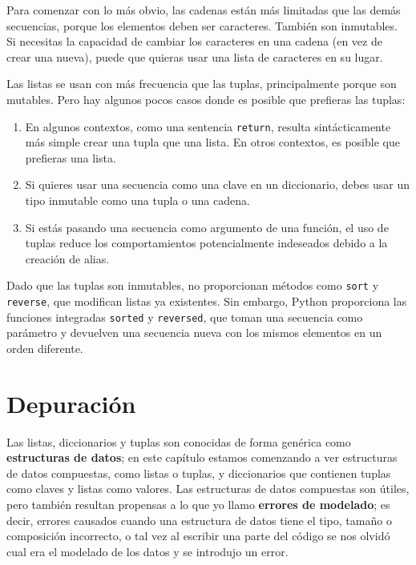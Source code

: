 
Para comenzar con lo más obvio, las cadenas están más limitadas que las demás
secuencias, porque los elementos deben ser caracteres. También son
inmutables. Si necesitas la capacidad de cambiar los caracteres
en una cadena (en vez de crear una nueva), puede que
quieras usar una lista de caracteres en su lugar.

Las listas se usan con más frecuencia que las tuplas, principalmente porque son mutables.
Pero hay algunos pocos casos donde es posible que prefieras las tuplas:

\begin{enumerate}

\item En algunos contextos, como una sentencia {\tt return}, resulta
sintácticamente más simple crear una tupla que una lista. En otros
contextos, es posible que prefieras una lista.

\item Si quieres usar una secuencia como una clave en un diccionario,
debes usar un tipo inmutable como una tupla o una cadena.

\item Si estás pasando una secuencia como argumento de una función,
el uso de tuplas reduce los comportamientos potencialmente indeseados
debido a la creación de alias.

\end{enumerate}

Dado que las tuplas son inmutables, no proporcionan métodos
como {\tt sort} y {\tt reverse}, que modifican listas ya existentes.
Sin embargo, Python proporciona las funciones integradas {\tt sorted}
y {\tt reversed}, que toman una secuencia como parámetro
y devuelven una secuencia nueva con los mismos elementos en un
orden diferente.



\section{Depuración}


Las listas, diccionarios y tuplas son conocidas de forma genérica como
{\bf estructuras de datos}; en este capítulo estamos comenzando a ver
estructuras de datos compuestas, como listas o tuplas, y diccionarios que contienen tuplas
como claves y listas como valores. Las estructuras de datos compuestas son útiles, pero
también resultan propensas a lo que yo llamo {\bf errores de modelado}; es decir, errores
causados cuando una estructura de datos tiene el tipo, tamaño o composición incorrecto,
o tal vez al escribir una parte del código se nos olvidó cual era el modelado
de los datos y se introdujo un error.


